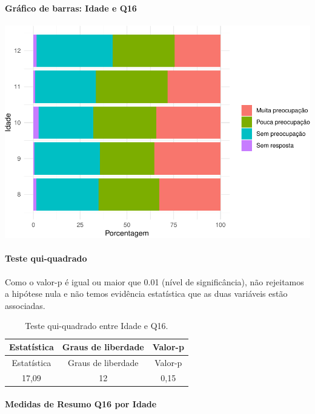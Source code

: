\documentclass[]{article}
\let\oldparagraph\paragraph
\renewcommand{\paragraph}[1]{\oldparagraph{#1}\mbox{}}
\begin{document}
\hypertarget{gruxe1fico-de-barras-idade-e-q16}{%
\paragraph{Gráfico de barras: Idade e Q16}\label{gruxe1fico-de-barras-idade-e-q16}}

\begin{center}\includegraphics[width=0.75\linewidth]{relatorio_covid19_files/figure-latex/unnamed-chunk-152-1} \end{center}

\hypertarget{teste-qui-quadrado-14}{%
\paragraph{Teste qui-quadrado}\label{teste-qui-quadrado-14}}

Como o valor-p é igual ou maior que 0.01 (nível de significância), não rejeitamos a hipótese nula e não temos evidência estatística que as duas variáveis estão associadas.

\begin{longtable}[]{@{}ccc@{}}
\caption{\label{tab:unnamed-chunk-154}Teste qui-quadrado entre Idade e Q16.}\tabularnewline
\toprule
Estatística & Graus de liberdade & Valor-p\tabularnewline
\midrule
\endfirsthead
\toprule
Estatística & Graus de liberdade & Valor-p\tabularnewline
\midrule
\endhead
17,09 & 12 & 0,15\tabularnewline
\bottomrule
\end{longtable}

\cleardoublepage

\hypertarget{medidas-de-resumo-q16-por-idade}{%
\paragraph{Medidas de Resumo Q16 por Idade}\label{medidas-de-resumo-q16-por-idade}}
\end{document}
